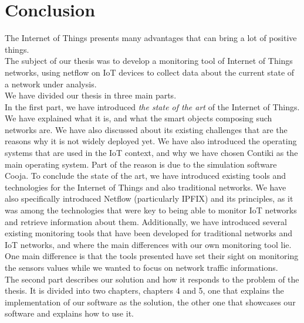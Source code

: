 \chapter*{Conclusion}

The Internet of Things presents many advantages that can bring a lot of positive things. \\

The subject of our thesis was to develop a monitoring tool of Internet of Things networks, using netflow on IoT devices to collect data about the current state of a network under analysis.\\

We have divided our thesis in three main parts. \\

In the first part, we have introduced \textit{the state of the art} of the Internet of Things. We have explained what it is, and what the smart objects composing such networks are. We have also discussed about its existing challenges that are the reasons why it is not widely deployed yet. We have also introduced the operating systems that are used in the IoT context, and why we have chosen Contiki as the main operating system. Part of the reason is due to the simulation software Cooja. To conclude the state of the art, we have introduced existing tools and technologies for the Internet of Things and also traditional networks. We have also specifically introduced Netflow (particularly IPFIX) and its principles, as it was among the technologies that were key to being able to monitor IoT networks and retrieve information about them. Additionally, we have introduced several existing monitoring tools that have been developed for traditional networks and IoT networks, and where the main differences with our own monitoring tool lie. One main difference is that the tools presented have set their sight on monitoring the sensors values while we wanted to focus on network traffic informations.\\

The second part describes our solution and how it responds to the problem of the thesis. It is divided into two chapters, chapters 4 and 5, one that explains the implementation of our software as the solution, the other one that showcases our software and explains how to use it.\\

